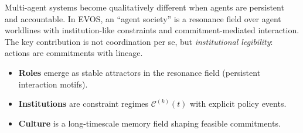 \documentclass[11pt]{article}
\begin{document}
Multi-agent systems become qualitatively different when agents are persistent and accountable.
In EVOS, an ``agent society'' is a resonance field over agent worldlines with institution-like
constraints and commitment-mediated interaction. The key contribution is not coordination per se,
but \emph{institutional legibility}: actions are commitments with lineage.

\begin{itemize}
  \item \textbf{Roles} emerge as stable attractors in the resonance field (persistent interaction motifs).
  \item \textbf{Institutions} are constraint regimes $\mathcal{C}^{(k)}(t)$ with explicit policy events.
  \item \textbf{Culture} is a long-timescale memory field shaping feasible commitments.
\end{itemize}
\end{document}
